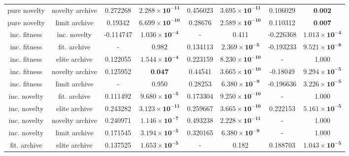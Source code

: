 \begin{tabular}{cccccccc}
   pure novelty & novelty archive &       0.272268 & $\mathbf{2.288 \times 10^{-11}}$ &    0.456023 & $\mathbf{3.695 \times 10^{-11}}$ &    0.106029 &                 $\textbf{0.002}$ \\
   pure novelty &   limit archive &        0.19342 & $\mathbf{6.699 \times 10^{-10}}$ &     0.28676 & $\mathbf{2.589 \times 10^{-10}}$ &    0.110312 &                 $\textbf{0.007}$ \\
   inc. fitness &    inc. novelty &      -0.114747 &  $\mathbf{1.036 \times 10^{-4}}$ &           - &                            0.411 &   -0.226368 &  $\mathbf{1.013 \times 10^{-4}}$ \\
   inc. fitness &    fit. archive &              - &                            0.982 &    0.134113 &  $\mathbf{2.369 \times 10^{-5}}$ &   -0.193233 &  $\mathbf{9.521 \times 10^{-8}}$ \\
   inc. fitness &   elite archive &       0.122055 &  $\mathbf{1.544 \times 10^{-4}}$ &    0.223159 & $\mathbf{8.230 \times 10^{-10}}$ &           - &                            1.000 \\
   inc. fitness & novelty archive &       0.125952 &                 $\textbf{0.047}$ &     0.44541 & $\mathbf{3.665 \times 10^{-10}}$ &    -0.18049 &  $\mathbf{9.294 \times 10^{-5}}$ \\
   inc. fitness &   limit archive &              - &                            0.950 &     0.28253 &  $\mathbf{6.380 \times 10^{-9}}$ &   -0.196636 &  $\mathbf{3.226 \times 10^{-5}}$ \\
   inc. novelty &    fit. archive &       0.111492 &  $\mathbf{9.680 \times 10^{-5}}$ &    0.173304 & $\mathbf{9.250 \times 10^{-10}}$ &           - &                            1.000 \\
   inc. novelty &   elite archive &       0.243282 & $\mathbf{3.123 \times 10^{-11}}$ &    0.259667 & $\mathbf{3.665 \times 10^{-10}}$ &    0.222153 &  $\mathbf{5.161 \times 10^{-5}}$ \\
   inc. novelty & novelty archive &       0.240971 &  $\mathbf{1.146 \times 10^{-7}}$ &    0.493238 & $\mathbf{2.228 \times 10^{-11}}$ &           - &                            1.000 \\
   inc. novelty &   limit archive &       0.171545 &  $\mathbf{3.194 \times 10^{-5}}$ &    0.320165 &  $\mathbf{6.380 \times 10^{-9}}$ &           - &                            1.000 \\
   fit. archive &   elite archive &       0.137525 &  $\mathbf{1.653 \times 10^{-5}}$ &           - &                            0.182 &    0.188703 &  $\mathbf{1.043 \times 10^{-5}}$ \\

\end{tabular}
